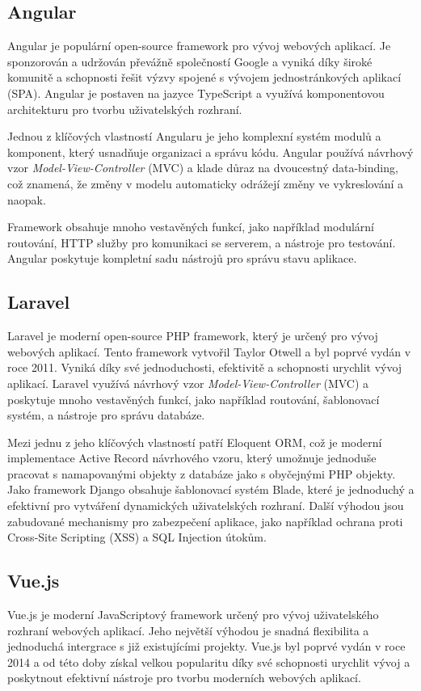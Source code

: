 \subsection{Angular}
\label{subsec:dev-framework-angular}
Angular je populární open-source framework pro vývoj webových aplikací. Je sponzorován a udržován převážně společností Google a vyniká díky široké komunitě a schopnosti řešit výzvy spojené s vývojem jednostránkových aplikací (SPA). Angular je postaven na jazyce TypeScript a využívá komponentovou architekturu pro tvorbu uživatelských rozhraní.

Jednou z klíčových vlastností Angularu je jeho komplexní systém modulů a komponent, který usnadňuje organizaci a správu kódu. Angular používá návrhový vzor \textit{Model-View-Controller} (MVC) a klade důraz na dvoucestný data-binding, což znamená, že změny v modelu automaticky odrážejí změny ve vykreslování a naopak.

Framework obsahuje mnoho vestavěných funkcí, jako například modulární routování, HTTP služby pro komunikaci se serverem, a nástroje pro testování. Angular poskytuje kompletní sadu nástrojů pro správu stavu aplikace. \cite{about_angular}

\subsection{Laravel}
\label{subsec:dev-framework-laravel}
Laravel je moderní open-source PHP framework, který je určený pro vývoj webových aplikací. Tento framework vytvořil Taylor Otwell a byl poprvé vydán v roce 2011. Vyniká díky své jednoduchosti, efektivitě a schopnosti urychlit vývoj aplikací. Laravel využívá návrhový vzor \textit{Model-View-Controller} (MVC) a poskytuje mnoho vestavěných funkcí, jako například routování, šablonovací systém, a nástroje pro správu databáze.

Mezi jednu z jeho klíčových vlastností patří Eloquent ORM, což je moderní implementace Active Record návrhového vzoru, který umožnuje jednoduše pracovat s namapovanými objekty z databáze jako s obyčejnými PHP objekty. Jako framework Django obsahuje šablonovací systém Blade, které je jednoduchý a efektivní pro vytváření dynamických uživatelských rozhraní. Další výhodou jsou zabudované mechanismy pro zabezpečení aplikace, jako například ochrana proti Cross-Site Scripting (XSS) a SQL Injection útokům. \cite{about_laravel}

\subsection{Vue.js}
\label{subsec:dev-framework-vuejs}
Vue.js je moderní JavaScriptový framework určený pro vývoj uživatelského rozhraní webových aplikací. Jeho největší výhodou je snadná flexibilita a jednoduchá intergrace s již existujícími projekty. Vue.js byl poprvé vydán v roce 2014 a od této doby získal velkou popularitu díky své schopnosti urychlit vývoj a poskytnout efektivní nástroje pro tvorbu moderních webových aplikací.


